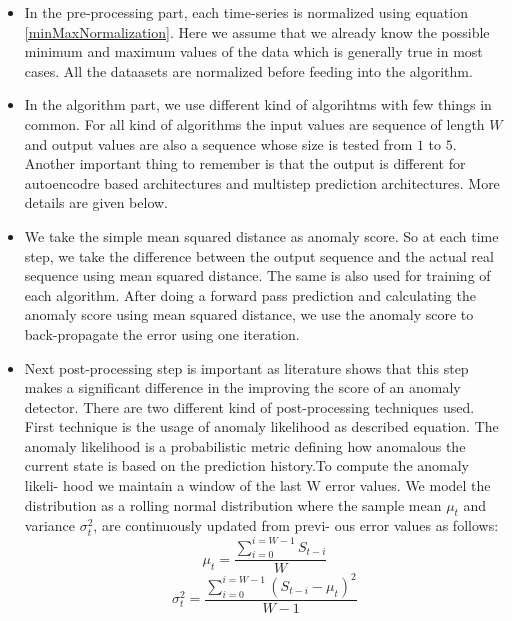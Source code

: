 \documentclass[12pt]{article}
\begin{document}
\begin{itemize}
\item In the pre-processing part, each time-series is normalized using equation \ref{minMaxNormalization}. Here we assume that we already know the possible minimum and maximum values of the data which is generally true in most cases. All the dataasets are normalized before feeding into the algorithm.
\item In the algorithm part, we use different kind of algorihtms with few things in common. For all kind of algorithms the input values are sequence of length $W$ and output values are also a sequence whose size is tested from $1$ to $5$. Another important thing to remember is that the output is different for autoencodre based architectures and multistep prediction architectures. More details are given below.
\item We take the simple mean squared distance as anomaly score. So at each time step, we take the difference between the output sequence and the actual real sequence using mean squared distance. The same is also used for training of each algorithm. After doing a forward pass prediction and calculating the anomaly score using mean squared distance, we use the anomaly score to back-propagate the error using one iteration.
\item Next post-processing step is important as literature shows that this step makes a significant difference in the improving the score of an anomaly detector. There are two different kind of post-processing techniques used. First technique is the usage of anomaly likelihood as described equation.
The anomaly likelihood is a probabilistic metric defining how anomalous the current state is based on the prediction history.To compute the anomaly likeli-
hood we maintain a window of the last W error values. We model
the distribution as a rolling normal distribution where the sample
mean $\mu_t$ and variance $\sigma^2_t$, are continuously updated from previ-
ous error values as follows:
\begin{equation}
\mu_t = \frac{\sum_{i=0}^{i=W-1} S_{t-i}}{W}
\end{equation}
\begin{equation}
\sigma^2_t=\frac{\sum_{i=0}^{i=W-1} (S_{t-i}-\mu_t)^2}{W-1}
\end{equation}


\end{itemize}
\end{document}
